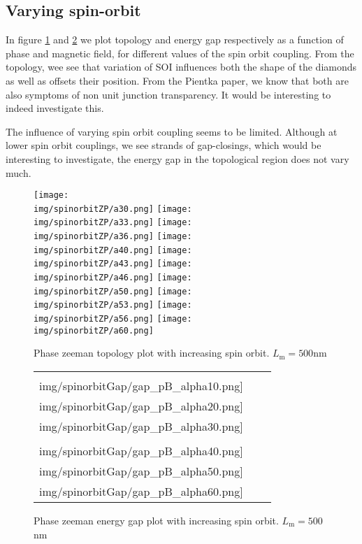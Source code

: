 \documentclass[10pt,a4paper]{article}
\newcommand{\img}{./images}
\begin{document}
\newpage
	\subsection{Varying spin-orbit}
	In figure \ref{fig:pfaf_pB_soi} and \ref{fig:gap_pB_soi} we plot topology and energy gap respectively as a function of phase and magnetic field, for different values of the spin orbit coupling.
	From the topology, wee see that variation of SOI influences both the shape of the diamonds as well as offsets their position.
	From the Pientka paper, we know that both are also symptoms of non unit junction transparency.
	It would be interesting to indeed investigate this.
	
	The influence of varying spin orbit coupling seems to be limited.
	Although at lower spin orbit couplings, we see strands of gap-closings, which would be interesting to investigate, the energy gap in the topological region does not vary much.
		\begin{figure}[H]
			\texttt{[image: \\img/spinorbitZP/a30.png]}
			\texttt{[image: \\img/spinorbitZP/a33.png]}
			\texttt{[image: \\img/spinorbitZP/a36.png]}
			\texttt{[image: \\img/spinorbitZP/a40.png]}
			\texttt{[image: \\img/spinorbitZP/a43.png]}
			\texttt{[image: \\img/spinorbitZP/a46.png]}
			\texttt{[image: \\img/spinorbitZP/a50.png]}
			\texttt{[image: \\img/spinorbitZP/a53.png]}
			\texttt{[image: \\img/spinorbitZP/a56.png]}
			\texttt{[image: \\img/spinorbitZP/a60.png]}
			\caption{Phase zeeman topology plot with increasing spin orbit. $L_\text{m}=500$nm}
			\label{fig:pfaf_pB_soi}
		\end{figure}
	
		\begin{figure}[H]
			\begin{tabular}{ccc}
				\texttt{[image: \\img/spinorbitGap/gap\_pB\_alpha10.png]}&
				\texttt{[image: \\img/spinorbitGap/gap\_pB\_alpha20.png]}&
				\texttt{[image: \\img/spinorbitGap/gap\_pB\_alpha30.png]}\\
				\texttt{[image: \\img/spinorbitGap/gap\_pB\_alpha40.png]}&
				\texttt{[image: \\img/spinorbitGap/gap\_pB\_alpha50.png]}&
				\texttt{[image: \\img/spinorbitGap/gap\_pB\_alpha60.png]}\\
			\end{tabular}
			\caption{Phase zeeman energy gap plot with increasing spin orbit. $L_\text{m}=500$nm}
			\label{fig:gap_pB_soi}
		\end{figure}
\newpage	
\end{document}
